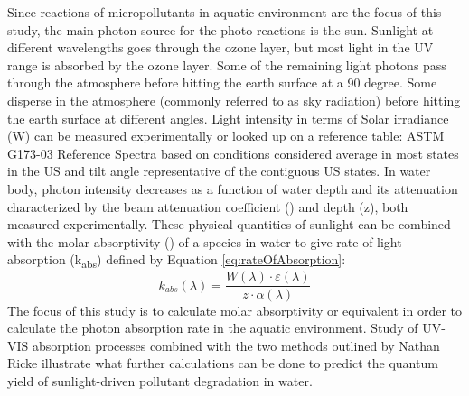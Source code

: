 \documentclass[
journal=jpcbfk, %
manuscript=article]{achemso}
\begin{document}
	Since reactions of micropollutants in aquatic environment are the focus of this study, the main photon source for the photo-reactions is the sun. Sunlight at different wavelengths goes through the ozone layer, but most light in the UV range is absorbed by the ozone layer.\cite{Leifer1988} Some of the remaining light photons pass through the atmosphere before hitting the earth surface at a 90 degree. Some disperse in the atmosphere (commonly referred to as sky radiation\cite{Schwarzenbach2005}) before hitting the earth surface at different angles. Light intensity in terms of Solar irradiance (W) can be measured experimentally or looked up on a reference table: ASTM G173-03 Reference Spectra based on conditions considered average in most states in the US and tilt angle representative of the contiguous US states.\cite{astm}   In water body, photon intensity decreases as a function of water depth and its attenuation characterized by the beam attenuation coefficient (\textalpha) and depth (z), both measured experimentally. These physical quantities of sunlight can be combined with the molar absorptivity (\textepsilon) of a species in water to give rate of light absorption (k\textsubscript{abs}) defined by Equation \ref{eq:rateOfAbsorption}:
	\begin{equation}
	\label{eq:rateOfAbsorption}
	k_{abs}(\lambda)=\frac{W(\lambda)\cdot \varepsilon(\lambda)}{z\cdot\alpha(\lambda)}
	\end{equation}
	The focus of this study is to calculate molar absorptivity or equivalent in order to calculate the photon absorption rate in the aquatic environment. Study of UV-VIS absorption processes combined with the two methods outlined by Nathan Ricke illustrate what further calculations can be done to predict the quantum yield of sunlight-driven pollutant degradation in water.	
	
\end{document}
